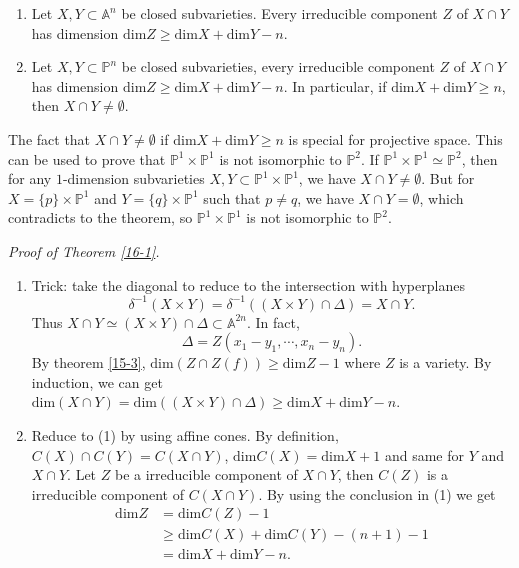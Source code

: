 \begin{theorem}\label{16-1}
  {}
  \noindent
	\begin{enumerate}
		\item Let $ X,Y\subset \mathbb{A}^n $ be closed subvarieties. Every irreducible component $ Z $ of $ X\cap Y $ has dimension $ \mathrm{dim}Z\geq \mathrm{dim}X+\mathrm{dim}Y-n $.
		\item Let $ X,Y\subset \mathbb{P}^n $ be closed subvarieties, every irreducible component $ Z $ of $ X\cap Y $ has dimension $ \mathrm{dim}Z\geq \mathrm{dim}X+\mathrm{dim}Y-n $. In particular, if $ \mathrm{dim}X+\mathrm{dim}Y\geq n $, then $ X\cap Y\neq \emptyset $.
	\end{enumerate}
\end{theorem}

\begin{remark}
	The fact that $ X\cap Y\neq \emptyset $ if $\mathrm{dim}X+\mathrm{dim}Y\geq n $ is special for projective space. This can be used to prove that $ \mathbb{P}^1\times\mathbb{P}^1 $ is not isomorphic to $ \mathbb{P}^2 $. If $ \mathbb{P}^1\times\mathbb{P}^1 \simeq \mathbb{P}^2$, then for any $ 1 $-dimension subvarieties $ X,Y \subset \mathbb{P}^1\times \mathbb{P}^1$, we have $ X\cap Y \neq \emptyset $. But for $ X=\lbrace p\rbrace\times \mathbb{P}^1$ and $ Y=\lbrace q\rbrace \times \mathbb{P}^1 $ such that $ p\neq q $, we have $ X\cap Y=\emptyset $, which contradicts to the theorem, so $ \mathbb{P}^1\times\mathbb{P}^1 $ is not isomorphic to $ \mathbb{P}^2 $.
\end{remark}
\itshape{Proof of Theorem \ref{16-1}.}
	\begin{enumerate}
		\item Trick: take the diagonal to reduce to the intersection with hyperplanes
		      $$
			      \delta^{-1}(X\times Y)=\delta^{-1}((X\times Y)\cap \Delta)=X\cap Y.
		      $$
		      Thus $ X\cap Y\simeq (X\times Y)\cap \Delta\subset \mathbb{A}^{2n} $. In fact,
		      $$
			      \Delta =Z(x_1-y_1,\cdots,x_n-y_n).
		      $$
		      By theorem \ref{15-3}, $ \mathrm{dim}(Z\cap Z(f))\geq \mathrm{dim}Z-1 $ where $ Z $ is a variety. By induction, we can get $ \mathrm{dim}(X\cap Y)=\mathrm{dim}((X\times Y)\cap \Delta)\geq \mathrm{dim}X+\mathrm{dim}Y-n $.
		\item Reduce to (1) by using affine cones. By definition, $ C(X)\cap C(Y)=C(X\cap Y) $, $ \mathrm{dim}C(X)=\mathrm{dim}X+1 $ and same for $ Y $ and $ X\cap Y $. Let $ Z $ be a irreducible component of $ X\cap Y $, then $ C(Z) $ is a irreducible component of $ C(X\cap Y) $.  By using the conclusion in (1) we get
		      \begin{align*}
			      \mathrm{dim}Z & =     \mathrm{dim}C(Z)-1                             \\
			                    & \geq  \mathrm{dim}C(X)+\mathrm{dim}C(Y)-(n+1)-1  { } \\
			                    & =     \mathrm{dim}X+\mathrm{dim}Y-n.
		      \end{align*}
	\end{enumerate}
